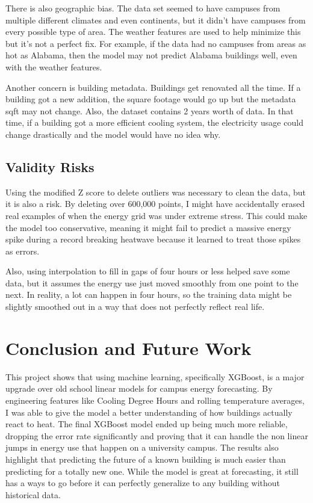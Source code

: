 \documentclass[conference]{IEEEtran}
\begin{document}
There is also geographic bias. The data set seemed to have campuses from multiple different climates and even continents, but it didn’t have campuses from every possible type of area. The weather features are used to help minimize this but it’s not a perfect fix. For example, if the data had no campuses from areas as hot as Alabama, then the model may not predict Alabama buildings well, even with the weather features.

Another concern is building metadata. Buildings get renovated all the time. If a building got a new addition, the square footage would go up but the metadata sqft may not change. Also, the dataset contains 2 years worth of data. In that time, if a building got a more efficient cooling system, the electricity usage could change drastically and the model would have no idea why.

\subsection{Validity Risks} 
Using the modified Z score to delete outliers was necessary to clean the data, but it is also a risk. By deleting over 600,000 points, I might have accidentally erased real examples of when the energy grid was under extreme stress. This could make the model too conservative, meaning it might fail to predict a massive energy spike during a record breaking heatwave because it learned to treat those spikes as errors.

Also, using interpolation to fill in gaps of four hours or less helped save some data, but it assumes the energy use just moved smoothly from one point to the next. In reality, a lot can happen in four hours, so the training data might be slightly smoothed out in a way that does not perfectly reflect real life.







\section{Conclusion and Future Work}
This project shows that using machine learning, specifically XGBoost, is a major upgrade over old school linear models for campus energy forecasting. By engineering features like Cooling Degree Hours and rolling temperature averages, I was able to give the model a better understanding of how buildings actually react to heat. The final XGBoost model ended up being much more reliable, dropping the error rate significantly and proving that it can handle the non linear jumps in energy use that happen on a university campus.
The results also highlight that predicting the future of a known building is much easier than predicting for a totally new one. While the model is great at forecasting, it still has a ways to go before it can perfectly generalize to any building without historical data.
\end{document}
